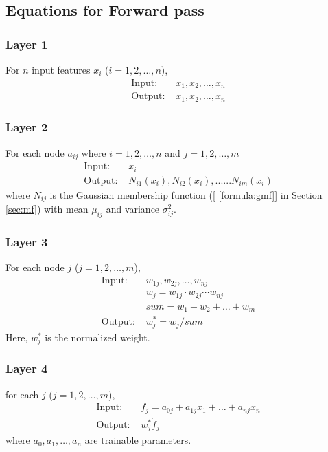 \documentclass[11pt,a4paper]{article}
\begin{document}
\subsection{Equations for Forward pass}
\subsubsection{Layer 1}
For $n$ input features $x_i$  ($i = 1,2, \dots ,n$),
\begin{align}
    \text{Input: } & x_1,x_2,\dots,x_n \\
    \text{Output: } & x_1,x_2,\dots,x_n
\end{align}

\subsubsection{Layer 2}
For each node $a_{ij}$ where $i = 1,2, \dots ,n$ and $j = 1,2, \dots ,m$
\begin{align}
    \text{Input: } & x_i \\
    \text{Output: } & N_{i1}(x_i),N_{i2}(x_i),......N_{im}(x_i)
\end{align}
where $N_{ij}$ is the Gaussian membership function ([ \ref{formula:gmf}] in Section \ref{sec:mf}) with mean $\mu_{ij}$ and variance $\sigma_{ij}^2$.

\subsubsection{Layer 3}
For each node $j$ ($j = 1,2, \dots ,m$),
\begin{align}
    \text{Input: } & w_{1j}, w_{2j}, \dots, w_{nj} \\
    ~ & w_{j} = w_{1j} \cdot w_{2j} \cdots w_{nj} \\
    ~ & sum =  w_{1}+w_{2}+ \dots + w_{m} \\
    \text{Output: } & w^*_j = w_{j}/sum
\end{align}
Here, $w^*_j$ is the normalized weight.

\subsubsection{Layer 4}
for each $j$ ($j = 1,2, \dots ,m$),
\begin{align}
    \text{Input: } & f_j= a_{0j}+a_{1j}x_1+\dots+a_{nj}x_{n} \\
    \text{Output: } & w^*_j\dot f_j
\end{align}
where $a_0,a_1,\dots,a_n$ are trainable parameters.
\end{document}
